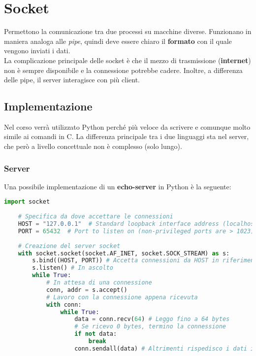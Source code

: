 \newpage
\section{Socket}
Permettono la comunicazione tra due processi su macchine diverse. Funzionano in maniera analoga alle \textit{pipe}, quindi deve essere chiaro il \textbf{formato} con il quale vengono inviati i dati.\\
La complicazione principale delle socket è che il mezzo di trasmissione (\textbf{internet}) non è sempre disponibile e la connessione potrebbe cadere. Inoltre, a differenza delle pipe, il server interagisce con più client.

\subsection{Implementazione}
Nel corso verrà utilizzato Python perché più veloce da scrivere e comunque molto simile ai comandi in C. La differenza principale tra i due linguaggi sta nel server, che però a livello concettuale non è complesso (solo lungo).
\subsubsection{Server}
Una possibile implementazione di un \textbf{echo-server} in Python è la seguente:
\begin{lstlisting}[language=Python]
	import socket
	
	# Specifica da dove accettare le connessioni
	HOST = "127.0.0.1"  # Standard loopback interface address (localhost)
	PORT = 65432  # Port to listen on (non-privileged ports are > 1023)
	
	# Creazione del server socket
	with socket.socket(socket.AF_INET, socket.SOCK_STREAM) as s:
		s.bind((HOST, PORT)) # Accetta connessioni da HOST in riferimento alla porta PORT
		s.listen() # In ascolto
		while True:
			# In attesa di una connessione
			conn, addr = s.accept()
			# Lavoro con la connessione appena ricevuta 
			with conn:
				while True:
					data = conn.recv(64) # Leggo fino a 64 bytes
					# Se ricevo 0 bytes, termino la connessione
					if not data:
						break
					conn.sendall(data) # Altrimenti rispedisco i dati indietro
\end{lstlisting}

